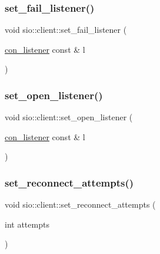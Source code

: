 \subsubsection{\texorpdfstring{set\+\_\+fail\+\_\+listener()}{set\_fail\_listener()}}
{\footnotesize\ttfamily void sio\+::client\+::set\+\_\+fail\+\_\+listener (\begin{DoxyParamCaption}\item[{\hyperlink{classsio_1_1client_a23951b626c91c87e866d4e966ec828fa}{con\+\_\+listener} const \&}]{l }\end{DoxyParamCaption})}

\mbox{\label{classsio_1_1client_a4cd8f0f1e1cc6cf0ee0e43c4b60cd2d6}} 
\subsubsection{\texorpdfstring{set\+\_\+open\+\_\+listener()}{set\_open\_listener()}}
{\footnotesize\ttfamily void sio\+::client\+::set\+\_\+open\+\_\+listener (\begin{DoxyParamCaption}\item[{\hyperlink{classsio_1_1client_a23951b626c91c87e866d4e966ec828fa}{con\+\_\+listener} const \&}]{l }\end{DoxyParamCaption})}

\mbox{\label{classsio_1_1client_a42ae73ea487b59582742d914d3d93e05}} 
\subsubsection{\texorpdfstring{set\+\_\+reconnect\+\_\+attempts()}{set\_reconnect\_attempts()}}
{\footnotesize\ttfamily void sio\+::client\+::set\+\_\+reconnect\+\_\+attempts (\begin{DoxyParamCaption}\item[{int}]{attempts }\end{DoxyParamCaption})}

\mbox{\label{classsio_1_1client_a50da06327e202468a47e24c8b71d6864}} 
